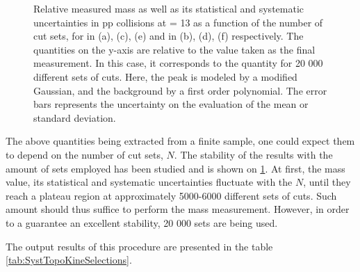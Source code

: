 \begin{figure}[!p]
\hspace*{-1.5cm}
\hspace*{-1.5cm}
\hspace*{-1.5cm}
\caption{Relative measured mass as well as its statistical and systematic uncertainties in pp collisions at \sqrtS = 13 \tev as a function of the number of cut sets, for \rmXi in (a), (c), (e) and \rmOmega in (b), (d), (f) respectively. The quantities on the y-axis are relative to the value taken as the final measurement. In this case, it corresponds to the quantity for 20 000 different sets of cuts. Here, the peak is modeled by a modified Gaussian, and the background by a first order polynomial. The error bars represents the uncertainty on the evaluation of the mean or standard deviation.}
	\label{fig:MassVsNentries}
\end{figure}

The above quantities being extracted from a finite sample, one could expect them to depend on the number of cut sets, $N$. The stability of the results with the amount of sets employed has been studied and is shown on \fig\ref{fig:MassVsNentries}. At first, the mass value, its statistical and systematic uncertainties fluctuate with the $N$, until they reach a plateau region at approximately 5000-6000 different sets of cuts. Such amount should thus suffice to perform the mass measurement. However, in order to a guarantee an excellent stability, 20 000 sets are being used.

The output results of this procedure are presented in the table \ref{tab:SystTopoKineSelections}.


